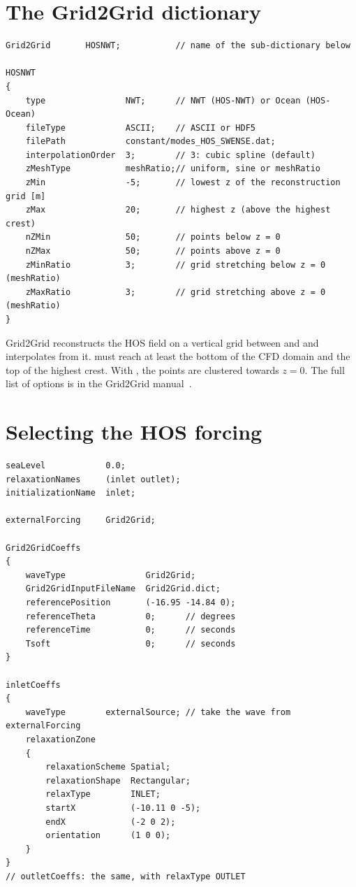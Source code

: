 
\section{The Grid2Grid dictionary}
\label{sec:g2gdict}
\begin{lstlisting}[caption={\file{constant/Grid2Grid.dict}.},label={lst:g2gdict}]
Grid2Grid       HOSNWT;           // name of the sub-dictionary below

HOSNWT
{
    type                NWT;      // NWT (HOS-NWT) or Ocean (HOS-Ocean)
    fileType            ASCII;    // ASCII or HDF5
    filePath            constant/modes_HOS_SWENSE.dat;
    interpolationOrder  3;        // 3: cubic spline (default)
    zMeshType           meshRatio;// uniform, sine or meshRatio
    zMin                -5;       // lowest z of the reconstruction grid [m]
    zMax                20;       // highest z (above the highest crest)
    nZMin               50;       // points below z = 0
    nZMax               50;       // points above z = 0
    zMinRatio           3;        // grid stretching below z = 0 (meshRatio)
    zMaxRatio           3;        // grid stretching above z = 0 (meshRatio)
}
\end{lstlisting}
Grid2Grid reconstructs the HOS field on a vertical grid between  and  and
interpolates from it.  must reach at least the bottom of the CFD domain and 
the top of the highest crest. With , the points are clustered towards $z=0$.
The full list of options is in the Grid2Grid manual~\cite{choi2019grid2grid}.

\section{Selecting the HOS forcing}
\label{sec:hos-setup}
\begin{lstlisting}[caption={HOS forcing in \file{constant/waveProperties.input}.},label={lst:hosprops}]
seaLevel            0.0;
relaxationNames     (inlet outlet);
initializationName  inlet;

externalForcing     Grid2Grid;

Grid2GridCoeffs
{
    waveType                Grid2Grid;
    Grid2GridInputFileName  Grid2Grid.dict;
    referencePosition       (-16.95 -14.84 0);
    referenceTheta          0;      // degrees
    referenceTime           0;      // seconds
    Tsoft                   0;      // seconds
}

inletCoeffs
{
    waveType        externalSource; // take the wave from externalForcing
    relaxationZone
    {
        relaxationScheme Spatial;
        relaxationShape  Rectangular;
        relaxType        INLET;
        startX           (-10.11 0 -5);
        endX             (-2 0 2);
        orientation      (1 0 0);
    }
}
// outletCoeffs: the same, with relaxType OUTLET
\end{lstlisting}

